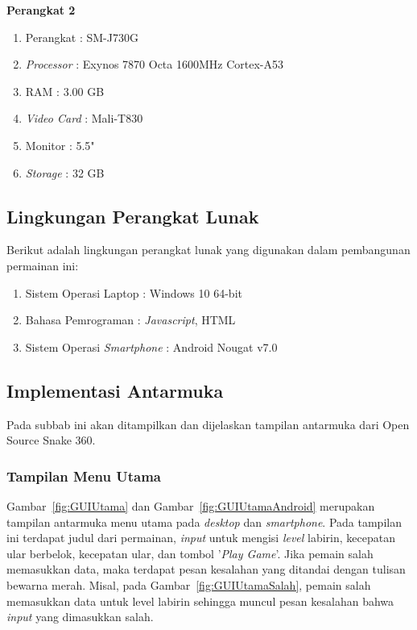 \textbf{Perangkat 2}\\
\begin{enumerate}
	\item Perangkat : SM-J730G
	\item \textit{Processor} : Exynos 7870 Octa 1600MHz Cortex-A53
	\item RAM : 3.00 GB
	\item \textit{Video Card} : Mali-T830
	\item Monitor : 5.5"
	\item \textit{Storage} : 32 GB
\end{enumerate}

\subsection{Lingkungan Perangkat Lunak}
Berikut adalah lingkungan perangkat lunak yang digunakan dalam pembangunan permainan ini:

\begin{enumerate}
	\item Sistem Operasi Laptop : Windows 10 64-bit
	\item Bahasa Pemrograman : \textit{Javascript}, HTML
	\item Sistem Operasi \textit{Smartphone} : Android Nougat v7.0
\end{enumerate}

\subsection{Implementasi Antarmuka}
Pada subbab ini akan ditampilkan dan dijelaskan tampilan antarmuka dari Open Source Snake 360. 

\subsubsection{Tampilan Menu Utama}
Gambar~\ref{fig:GUIUtama} dan Gambar~\ref{fig:GUIUtamaAndroid} merupakan tampilan antarmuka menu utama pada \textit{desktop} dan \textit{smartphone}. Pada tampilan ini terdapat judul dari permainan, \textit{input} untuk mengisi \textit{level} labirin, kecepatan ular berbelok, kecepatan ular, dan tombol '\textit{Play Game}'. Jika pemain salah memasukkan data, maka terdapat pesan kesalahan yang ditandai dengan tulisan bewarna merah. Misal, pada Gambar~\ref{fig:GUIUtamaSalah}, pemain salah memasukkan data untuk level labirin sehingga muncul pesan kesalahan bahwa \textit{input} yang dimasukkan salah.

